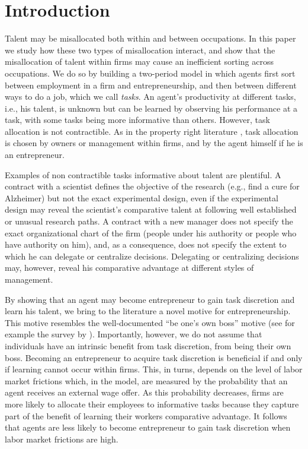 \documentclass[12pt,american]{paper}
\theoremstyle{remark}
\begin{document}
\pagebreak
\section{Introduction}
Talent may be misallocated both within and between occupations. In this paper we study how these two types of misallocation interact, and show that the misallocation of talent within firms may cause an inefficient sorting across occupations. We do so by building a two-period model in which agents first sort between employment in a firm and entrepreneurship, and then between different ways to do a job, which we call \textit{tasks}. An agent's productivity at different tasks, i.e., his talent, is unknown but can be learned by observing his performance at a task, with some tasks being more informative than others. However, task allocation is not contractible. As in the property right literature \citep{Grossman1986}, task allocation is chosen by owners or management within firms, and by the  agent himself if he is an entrepreneur. 

Examples of non contractible tasks informative about talent are plentiful. A contract with a scientist defines the objective of the research (e.g., find a cure for Alzheimer) but not the exact experimental design, even if the experimental design may reveal the scientist's comparative talent at following well established or unusual research paths. A contract with a new manager does not specify the exact organizational chart of the firm (people under his authority or people who have authority on him), and, as a consequence, does not specify the extent to which he can delegate or centralize decisions. Delegating or centralizing decisions may, however, reveal his comparative advantage at different styles of management.

By showing that an agent may become entrepreneur to gain task discretion and learn his talent, we bring to the literature a novel motive for entrepreneurship. This motive resembles the  well-documented ``be one's own boss'' motive  (see for example the survey by \citealp{stephan2015understanding}). Importantly, however, we do not assume that individuals have an intrinsic benefit from task discretion, from being their own boss. Becoming an entrepreneur to acquire task discretion is beneficial if and only if learning cannot occur within firms. This, in turns, depends on the level of labor market frictions which, in the model, are measured by the  probability that an agent receives an external wage offer. As this probability decreases, firms are more likely to allocate their  employees to informative tasks because they capture part of the benefit of learning their workers comparative advantage. It follows that agents are less likely to become entrepreneur to gain task discretion when labor market frictions are high.
\end{document}
